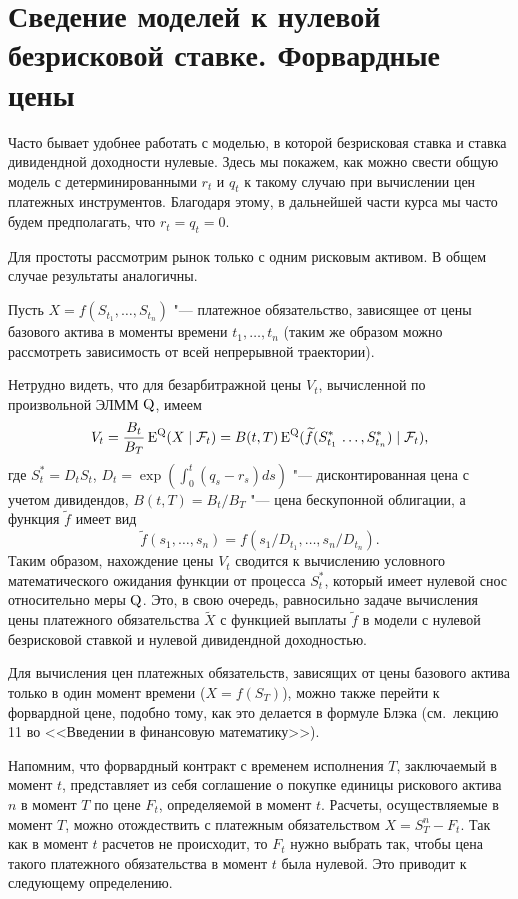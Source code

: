 \section{Сведение моделей к нулевой безрисковой ставке. Форвардные цены}
\label{gen:s:forward}

Часто бывает удобнее работать с моделью, в которой безрисковая ставка и ставка дивидендной доходности нулевые.
Здесь мы покажем, как можно свести общую модель с детерминированными $r_t$ и $q_t$ к такому случаю при вычислении цен платежных инструментов.
Благодаря этому, в дальнейшей части курса мы часто будем предполагать, что $r_t=q_t=0$.

Для простоты рассмотрим рынок только с одним рисковым активом.
В общем случае результаты аналогичны.

Пусть $X = f(S_{t_1},\dots, S_{t_n})$ "--- платежное обязательство, зависящее от цены базового актива в моменты времени $t_1,\dots,t_n$ (таким же образом можно рассмотреть зависимость от всей непрерывной траектории). 

Нетрудно видеть, что для безарбитражной цены $V_t$, вычисленной по произвольной ЭЛММ $\mathrm{Q}$, имеем
\[
V_t = \frac{B_t}{B_T} \operatorname{E}^{\mathrm{Q}}(X \mid \mathcal{F}_t) = B(t,T) \operatorname{E}^{\mathrm{Q}} (\widetilde f(S^*_{t_1}\,\dots,S^*_{t_n}) \mid \mathcal{F}_t),
\]
где $S_t^* = D_tS_t$, $D_t = \exp(\int_0^t (q_s-r_s)ds)$ "--- дисконтированная цена с учетом дивидендов, $B(t,T) = B_t/B_T$ "--- цена бескупонной облигации, а функция $\tilde f$ имеет вид
\[
\tilde f(s_1,\dots,s_n) = f(s_1/D_{t_1},\dots, s_n/D_{t_n}).
\]
Таким образом, нахождение цены $V_t$ сводится к вычислению условного математического ожидания функции от процесса $S_t^*$, который имеет нулевой снос относительно меры $\mathrm{Q}$.
Это, в свою очередь, равносильно задаче вычисления цены платежного обязательства $\tilde X$ с функцией выплаты $\tilde f$ в модели с нулевой безрисковой ставкой и нулевой дивидендной доходностью.

Для вычисления цен платежных обязательств, зависящих от цены базового актива только в один момент времени ($X=f(S_T)$), можно также перейти к форвардной цене, подобно тому, как это делается в формуле Блэка (см.~лекцию 11 во <<Введении в финансовую математику>>).

Напомним, что форвардный контракт с временем исполнения $T$, заключаемый в момент $t$, представляет из себя соглашение о покупке единицы рискового актива $n$ в момент $T$ по цене $F_t$, определяемой в момент $t$. 
Расчеты, осуществляемые в момент $T$, можно отождествить с платежным обязательством $X=S_T^n - F_t$.
Так как в момент $t$ расчетов не происходит, то $F_t$ нужно выбрать так, чтобы цена такого платежного обязательства в момент $t$ была нулевой.
Это приводит к следующему определению.

